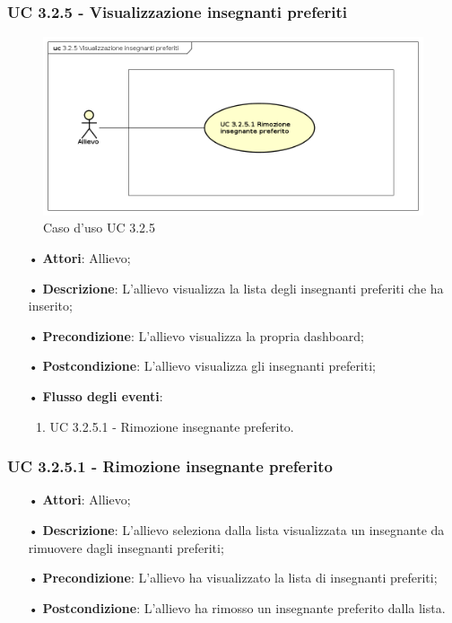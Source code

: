 \subsubsection{UC 3.2.5 - Visualizzazione insegnanti preferiti}
\begin{figure}[H]
	\centering
	\includegraphics[width=17cm]{img/UC325.png} 
	\caption{Caso d'uso UC 3.2.5}\label{fig:325}
\end{figure}
\begin{itemize}
	\item[•]\textbf{Attori}: Allievo;
	\item[•]\textbf{Descrizione}: L'allievo visualizza la lista degli insegnanti preferiti che ha inserito;
	\item[•]\textbf{Precondizione}: L'allievo visualizza la propria dashboard;
	\item[•]\textbf{Postcondizione}: L'allievo visualizza gli insegnanti preferiti;
	\item[•]\textbf{Flusso degli eventi}:
	\begin{enumerate}
		\item UC 3.2.5.1 - Rimozione insegnante preferito.
	\end{enumerate}
\end{itemize}

\subsubsection{UC 3.2.5.1 - Rimozione insegnante preferito}
\begin{itemize}
	\item[•]\textbf{Attori}: Allievo;
	\item[•]\textbf{Descrizione}: L'allievo seleziona dalla lista visualizzata un insegnante da rimuovere dagli insegnanti preferiti;
	\item[•]\textbf{Precondizione}: L'allievo ha visualizzato la lista di insegnanti preferiti;
	\item[•]\textbf{Postcondizione}: L'allievo ha rimosso un insegnante preferito dalla lista.
\end{itemize}


